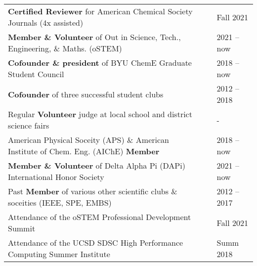\documentclass[letterpaper,11pt]{article}
\begin{document}
\begin{tabular}{@{}p{} p{} l@{}}
  \textbf{Certified Reviewer} for American Chemical Society Journals (4x assisted)                         & & Fall 2021 \\[4pt]
  \textbf{Member \& Volunteer} of Out in Science, Tech., Engineering, \& Maths. (oSTEM)                    & & 2021 -- now \\[4pt]
  \textbf{Cofounder \& president} of BYU ChemE Graduate Student Council                                    & & 2018 -- now \\[4pt]
  \textbf{Cofounder} of three successful student clubs                                                     & & 2012 -- 2018 \\[4pt]
  Regular \textbf{Volunteer} judge at local school and district science fairs                              & & - \\[4pt]
  American Physical Soceity (APS) \& American Institute of Chem. Eng. (AIChE) \textbf{Member}              & & 2018 -- now \\[4pt]
  \textbf{Member \& Volunteer} of Delta Alpha Pi (DAPi) International Honor Society                                 & & 2021 -- now \\[4pt]
  Past \textbf{Member} of various other scientific clubs \& soceities (IEEE, SPE, EMBS)                    & & 2012 -- 2017 \\[4pt]
  Attendance of the oSTEM Professional Development Summit                                                  & & Fall 2021 \\[4pt]
  Attendance of the UCSD SDSC High Performance Computing Summer Institute                                  & & Summ 2018 \\[4pt]

\end{tabular}
\end{document}
